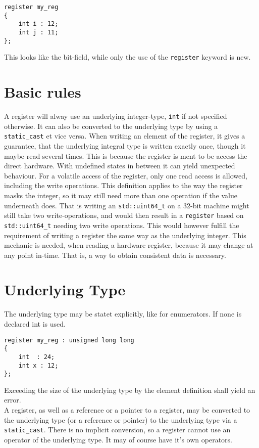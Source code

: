 \documentclass{scrreprt}
\begin{document}
\begin{lstlisting}
register my_reg
{
	int i : 12;
	int j : 11;
};
\end{lstlisting}
This looks like the bit-field, while only the use of the \lstinline {register}
keyword is new.
\section{Basic rules}
A register will alway use an underlying integer-type, \lstinline {int} if not
specified otherwise. It can also be converted to the underlying type by using a
\lstinline {static_cast} et vice versa.
When writing an element of the register, it gives a guarantee, that the
underlying integral type is written exactly once, though it maybe read several
times. 
This is because the register is ment to be access the direct hardware. With
undefined states in between it can yield unexpected behaviour.
For a volatile access of the register, only one read access is allowed,
including the write operations.
This definition applies to the way the register masks the integer, so it may
still need more than one operation if the value underneath does. 
That is writing an \lstinline {std::uint64_t} on a 32-bit machine might still take two
write-operations, and would then result in a \lstinline {register} based on
\lstinline {std::uint64_t} needing two write operations. This would however
fulfill the requirement of writing a register the same way as the underlying
integer.
This mechanic is needed, when reading a hardware register, because it
may change at any point in-time. That is, a way to obtain consistent data is
necessary.
\section{Underlying Type}
The underlying type may be statet explicitly, like for enumerators.
If none is declared int is used.
\begin{lstlisting}
register my_reg : unsigned long long
{
	int  : 24;
	int x : 12;
};
\end{lstlisting}
Exceeding the size of the underlying type by the element definition shall yield
an error.\\
A register, as well as a reference or a pointer to a register, may be converted
to the underlying type (or a reference or pointer) to the underlying type via a
\lstinline {static_cast}. There is no implicit conversion, so a register cannot
use an operator of the underlying type.
It may of course have it's own operators.
\end{document}
